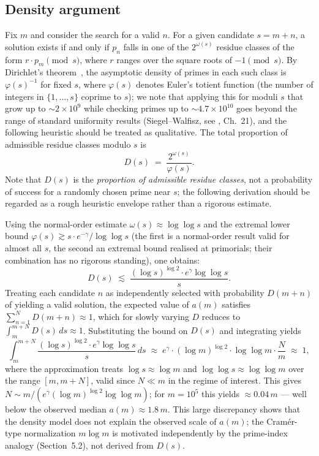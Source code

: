 \documentclass[12pt]{article}
\begin{document}
	\subsection{Density argument}
	
	Fix $m$ and consider the search for a valid $n$.
	For a given candidate $s = m + n$, a solution exists if and only if
	$p_n$ falls in one of the $2^{\omega(s)}$ residue classes of the form
	$r \cdot p_m \pmod{s}$, where $r$ ranges over the square roots of
	$-1 \pmod{s}$.
	By Dirichlet's theorem~\cite{Davenport}, the asymptotic density
	of primes in each such class is $\varphi(s)^{-1}$ for fixed $s$,
	where $\varphi(s)$ denotes Euler's totient function (the number of
	integers in $\{1, \ldots, s\}$ coprime to $s$); we note
	that applying this for moduli $s$ that grow up to $\sim 2 \times 10^9$
	while checking primes up to $\sim 4.7 \times 10^{10}$ goes beyond the
	range of standard uniformity results (Siegel--Walfisz,
	see \cite{Davenport}, Ch.~21), and the following heuristic should be
	treated as qualitative.
	The total proportion of admissible residue classes modulo $s$ is
	\[
	D(s) \;=\; \frac{2^{\omega(s)}}{\varphi(s)}.
	\]
	Note that $D(s)$ is the \emph{proportion of admissible residue classes},
	not a probability of success for a randomly chosen prime near $s$;
	the following derivation should be regarded as a rough heuristic
	envelope rather than a rigorous estimate.
	
	Using the normal-order estimate $\omega(s) \approx \log\log s$
	\cite{HardyRamanujan} and the extremal lower bound
	$\varphi(s) \gtrsim s \cdot e^{-\gamma}/\log\log s$
	\cite{Mertens}
	(the first is a normal-order result valid for almost all $s$, the
	second an extremal bound realised at primorials; their combination
	has no rigorous standing), one obtains:
	\[
	D(s) \;\lesssim\;
	\frac{(\log s)^{\log 2} \cdot e^{\gamma} \log\log s}{s}.
	\]
	Treating each candidate $n$ as independently selected with probability
	$D(m+n)$ of yielding a valid solution, the expected value of $a(m)$
	satisfies $\sum_{n=1}^{N} D(m+n) \approx 1$, which for slowly varying
	$D$ reduces to $\int_m^{m+N} D(s)\,ds \approx 1$.
	Substituting the bound on $D(s)$ and integrating yields
	\[
	\int_m^{m+N} \frac{(\log s)^{\log 2} \cdot e^{\gamma} \log\log s}{s}
	\,ds
	\;\approx\;
	e^{\gamma} \cdot (\log m)^{\log 2} \cdot \log\log m
	\cdot \frac{N}{m}
	\;\approx\; 1,
	\]
	where the approximation treats $\log s \approx \log m$ and
	$\log\log s \approx \log\log m$ over the range $[m, m+N]$, valid
	since $N \ll m$ in the regime of interest.
	This gives $N \sim m/(e^{\gamma} (\log m)^{\log 2} \log\log m)$;
	for $m = 10^5$ this yields
	$\approx 0.04\,m$ --- well below the observed median
	$a(m) \approx 1.8\,m$.
	This large discrepancy shows that the density model does not explain
	the observed scale of $a(m)$; the Cram\'er-type normalization
	$m\log m$ is motivated independently by the prime-index analogy
	(Section~5.2), not derived from $D(s)$.
	
\end{document}
